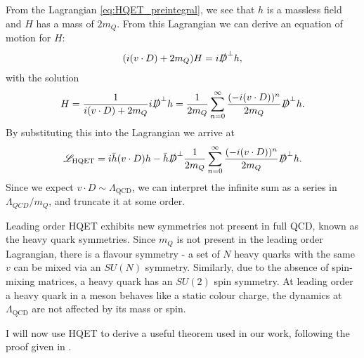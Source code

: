 From the Lagrangian \eqref{eq:HQET_preintegral}, we see that $h$ is a massless field and $H$ has a mass of $2m_Q$. From this Lagrangian we can derive an equation of motion for $H$:
\begin{align}
  ( i(v\cdot D) + 2m_Q) H = i\slashed{D}^{\perp} h,
\end{align}
with the solution
\begin{align}
  H = {1\over i(v\cdot D) + 2m_Q} i\slashed{D}^{\perp} h = {1\over 2m_Q}\sum_{n=0}^{\infty} {(-i(v\cdot D))^n\over 2m_Q} \slashed{D}^{\perp} h.
\end{align}
By substituting this into the Lagrangian we arrive at
\begin{align}
  \mathscr{L}_{\text{HQET}} = i \bar{h} (v\cdot D) h - \bar{h} \slashed{D}^{\perp} {1\over 2m_Q}\sum_{n=0}^{\infty} {(-i(v\cdot D))^n\over 2m_Q} \slashed{D}^{\perp} h.
  \label{eq:HQET_lagrangian}
\end{align}
Since we expect $v\cdot D \sim \Lambda_{\text{QCD}}$, we can interpret the infinite sum as a series in $\Lambda_{QCD}/m_Q$, and truncate it at some order. %

Leading order HQET exhibits new symmetries not present in full QCD, known as the heavy quark symmetries. Since $m_Q$ is not present in the leading order Lagrangian, there is a flavour symmetry - a set of $N$ heavy quarks with the same $v$ can be mixed via an $SU(N)$ symmetry. Similarly, due to the absence of spin-mixing matrices, a heavy quark has an $SU(2)$ spin symmetry. At leading order a heavy quark in a meson behaves like a static colour charge, the dynamics at $\Lambda_{\text{QCD}}$ are not affected by its mass or spin.

I will now use HQET to derive a useful theorem used in our work, following the proof given in \cite{Lebed:1991sq}.


